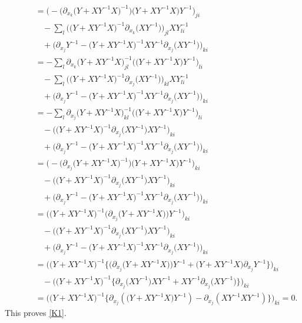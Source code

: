 \documentclass[pdftex]{sigma}
\numberwithin{equation}{section}
\begin{document}
\begin{gather*}
\phantom{\qquad-}{}= \bigl(-\bigl(\partial_{x_k}\bigl(Y+XY^{-1}X\bigr)^{-1}\bigr)\bigl(Y+XY^{-1}X\bigr)Y^{-1}\bigr)_{ji}\\
\phantom{\qquad-=}{} -\sum_l\bigl(\bigl(Y+XY^{-1}X\bigr)^{-1}\partial_{x_k}\bigl(XY^{-1}\bigr)\bigr)_{jl}XY^{-1}_{li}\\
\phantom{\qquad-=}{} +\bigl(\partial_{x_j}Y^{-1}-\bigl(Y+XY^{-1}X\bigr)^{-1}XY^{-1}\partial_{x_j}\bigl(XY^{-1}\bigr)\bigr)_{ki}\\
\phantom{\qquad-}{}= -\sum_l\partial_{x_k}\bigl(Y+XY^{-1}X\bigr)^{-1}_{jl}\bigl(\bigl(Y+XY^{-1}X\bigr)Y^{-1}\bigr)_{li}\\
\phantom{\qquad-=}{} -\sum_l\bigl(\bigl(Y+XY^{-1}X\bigr)^{-1}\partial_{x_j}\bigl(XY^{-1}\bigr)\bigr)_{kl}XY^{-1}_{li}\\
\phantom{\qquad-=}{} +\bigl(\partial_{x_j}Y^{-1}-\bigl(Y+XY^{-1}X\bigr)^{-1}XY^{-1}\partial_{x_j}\bigl(XY^{-1}\bigr)\bigr)_{ki} \\
\phantom{\qquad-}{}= -\sum_l\partial_{x_j}\bigl(Y+XY^{-1}X\bigr)^{-1}_{kl}\bigl(\bigl(Y+XY^{-1}X\bigr)Y^{-1}\bigr)_{li}\\
\phantom{\qquad-=}{} -\bigl(\bigl(Y+XY^{-1}X\bigr)^{-1}\partial_{x_j}\bigl(XY^{-1}\bigr)XY^{-1}\bigr)_{ki}\\
\phantom{\qquad-=}{} +\bigl(\partial_{x_j}Y^{-1}-\bigl(Y+XY^{-1}X\bigr)^{-1}XY^{-1}\partial_{x_j}\bigl(XY^{-1}\bigr)\bigr)_{ki} \\
\phantom{\qquad-}{}= \bigl(-\bigl(\partial_{x_j}\bigl(Y+XY^{-1}X\bigr)^{-1}\bigr)\bigl(Y+XY^{-1}X\bigr)Y^{-1}\bigr)_{ki}\\
\phantom{\qquad-=}{} -\bigl(\bigl(Y+XY^{-1}X\bigr)^{-1}\partial_{x_j}\bigl(XY^{-1}\bigr)XY^{-1}\bigr)_{ki}\\
\phantom{\qquad-=}{} +\bigl(\partial_{x_j}Y^{-1}-\bigl(Y+XY^{-1}X\bigr)^{-1}XY^{-1}\partial_{x_j}\bigl(XY^{-1}\bigr)\bigr)_{ki} \\
\phantom{\qquad-}{}= \bigl(\bigl(Y+XY^{-1}X\bigr)^{-1}\bigl(\partial_{x_j}\bigl(Y+XY^{-1}X\bigr)\bigr)Y^{-1}\bigr)_{ki}\\
\phantom{\qquad-=}{} -\bigl(\bigl(Y+XY^{-1}X\bigr)^{-1}\partial_{x_j}\bigl(XY^{-1}\bigr)XY^{-1}\bigr)_{ki}\\
\phantom{\qquad-=}{} +\bigl(\partial_{x_j}Y^{-1}-\bigl(Y+XY^{-1}X\bigr)^{-1}XY^{-1}\partial_{x_j}\bigl(XY^{-1}\bigr)\bigr)_{ki}
\\
\phantom{\qquad-}{}=\bigl( \bigl(Y+XY^{-1}X\bigr)^{-1}\big\{\bigl(\partial_{x_j}\bigl(Y+XY^{-1}X\bigr)\bigr)Y^{-1}+\bigl(Y+XY^{-1}X\bigr)\partial_{x_j}Y^{-1}\big\}\bigr)_{ki}\\
\phantom{\qquad-=}{}-\bigl( \bigl(Y+XY^{-1}X\bigr)^{-1}\big\{\partial_{x_j}\bigl(XY^{-1}\bigr)XY^{-1}+XY^{-1}\partial_{x_j}\bigl(XY^{-1}\bigr)\big\}\bigr)_{ki}\\
\phantom{\qquad-}{}=\bigl(\bigl(Y+XY^{-1}X\bigr)^{-1}\big\{\partial_{x_j}(\bigl(Y+XY^{-1}X\bigr)Y^{-1})-\partial_{x_j}(XY^{-1}XY^{-1})\big\}\bigr)_{ki}=0.
\end{gather*}
This proves \eqref{K1}.
\end{document}
